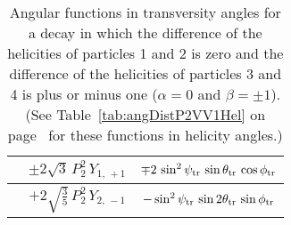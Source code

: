 \begin{table}[htbp]
\begin{tabular}{| c | c | c |}
    \ReAmp{\parallel}{\perp}  &
      $\pm 2\sqrt{3}\, P_2^2\, Y_{1,\,+1}$  &
      $\mp 2\, \sin^2\psi_\text{tr}\, \sin\theta_\text{tr}\, \cos\phi_\text{tr}$  \\
    \hline

    \ImAmp{\parallel}{\perp}  &
      $+2\sqrt{\tfrac{3}{5}}\, P_2^2\, Y_{2,\,-1}$  &
      $-\sin^2\psi_\text{tr}\, \sin2\theta_\text{tr}\, \sin\phi_\text{tr}$  \\
    \hline
  \end{tabular}

  \caption{Angular functions in transversity angles for a \PVV{} decay in which the difference of
    the helicities of particles 1 and 2 is zero and the difference of the helicities of particles 3
    and 4 is plus or minus one ($\alpha=0$ and $\beta=\pm1$). (See Table~\ref{tab:angDistP2VV1Hel}
    on page~\pageref{tab:angDistP2VV1Hel} for these functions in helicity angles.)}
  \label{tab:angDistP2VV1Tr}
\end{table}

